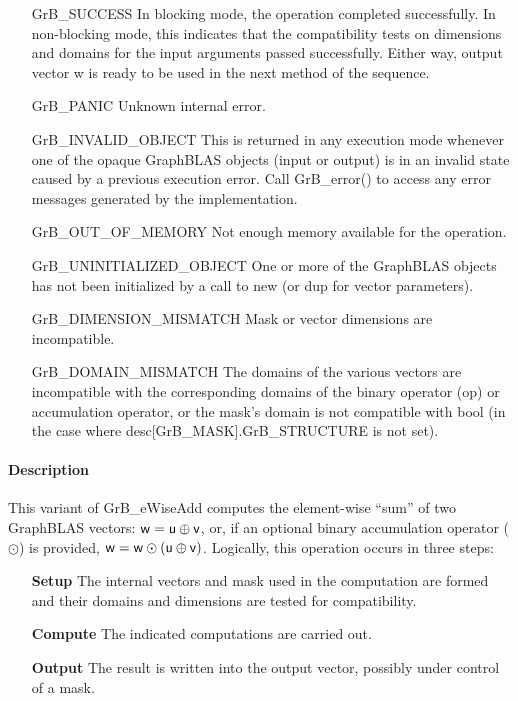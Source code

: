 \begin{itemize}[leftmargin=2.1in]
    \item[{\sf GrB\_SUCCESS}]         In blocking mode, the operation completed
    successfully. In non-blocking mode, this indicates that the compatibility 
    tests on dimensions and domains for the input arguments passed successfully. 
    Either way, output vector {\sf w} is ready to be used in the next method of 
    the sequence.

    \item[{\sf GrB\_PANIC}]           Unknown internal error.

    \item[{\sf GrB\_INVALID\_OBJECT}] This is returned in any execution mode 
    whenever one of the opaque GraphBLAS objects (input or output) is in an invalid 
    state caused by a previous execution error.  Call {\sf GrB\_error()} to access 
    any error messages generated by the implementation.

    \item[{\sf GrB\_OUT\_OF\_MEMORY}] Not enough memory available for the operation.

    \item[{\sf GrB\_UNINITIALIZED\_OBJECT}] One or more of the GraphBLAS objects
    has not been initialized by a call to {\sf new} (or {\sf dup} for vector
    parameters).

    \item[{\sf GrB\_DIMENSION\_MISMATCH}] Mask or vector dimensions are incompatible.

    \item[{\sf GrB\_DOMAIN\_MISMATCH}]    The domains of the various vectors are
    incompatible with the corresponding domains of the binary operator ({\sf op}) or
    accumulation operator, or the mask's domain is not compatible with {\sf bool}
    (in the case where {\sf desc[GrB\_MASK].GrB\_STRUCTURE} is not set).
\end{itemize}

\paragraph{Description}

This variant of {\sf GrB\_eWiseAdd} computes the element-wise ``sum'' of
two GraphBLAS vectors: ${\sf w} = {\sf u} \oplus {\sf v}$, or, if an optional
binary accumulation operator ($\odot$) is provided, ${\sf w} = {\sf w} \odot
\left({\sf u} \oplus {\sf v}\right)$.  Logically, this operation occurs in
three steps:
\begin{enumerate}[leftmargin=0.75in]
\item[\bf Setup] The internal vectors and mask used in the computation are formed 
and their domains and dimensions are tested for compatibility.
\item[\bf Compute] The indicated computations are carried out.
\item[\bf Output] The result is written into the output vector, possibly under 
control of a mask.
\end{enumerate}


